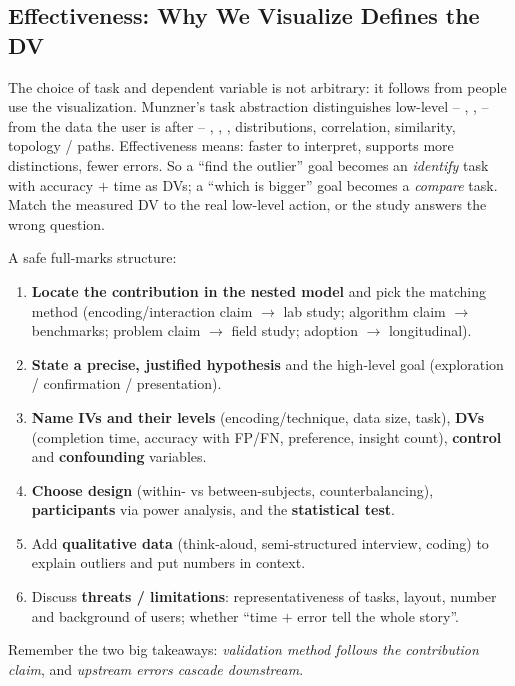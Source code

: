 \subsection{Effectiveness: Why We Visualize Defines the DV}

The choice of task and dependent variable is not arbitrary: it follows from
 people use the visualization. Munzner's task abstraction distinguishes
low-level  -- , ,  --
from the data  the user is after -- , ,
, distributions, correlation, similarity, topology / paths.
Effectiveness means: faster to interpret, supports more distinctions, fewer
errors. So a ``find the outlier'' goal becomes an \emph{identify} task with
accuracy $+$ time as DVs; a ``which is bigger'' goal becomes a \emph{compare}
task. Match the measured DV to the real low-level action, or the study answers
the wrong question.

\begin{exambox}
A safe full-marks structure:
\begin{enumerate}[label=\arabic*.]
  \item \textbf{Locate the contribution in the nested model} and pick the
        matching method (encoding/interaction claim $\rightarrow$ lab study;
        algorithm claim $\rightarrow$ benchmarks; problem claim $\rightarrow$
        field study; adoption $\rightarrow$ longitudinal).
  \item \textbf{State a precise, justified hypothesis} and the high-level goal
        (exploration / confirmation / presentation).
  \item \textbf{Name IVs and their levels} (encoding/technique, data size,
        task), \textbf{DVs} (completion time, accuracy with FP/FN, preference,
        insight count), \textbf{control} and \textbf{confounding} variables.
  \item \textbf{Choose design} (within- vs between-subjects, counterbalancing),
        \textbf{participants} via power analysis, and the \textbf{statistical
        test}.
  \item Add \textbf{qualitative data} (think-aloud, semi-structured interview,
        coding) to explain outliers and put numbers in context.
  \item Discuss \textbf{threats / limitations}: representativeness of tasks,
        layout, number and background of users; whether ``time $+$ error tell
        the whole story''.
\end{enumerate}
Remember the two big takeaways: \emph{validation method follows the contribution
claim}, and \emph{upstream errors cascade downstream}.
\end{exambox}
